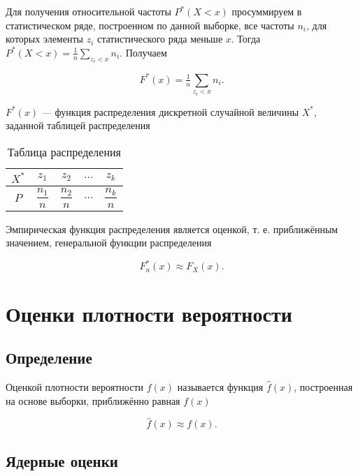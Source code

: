 \documentclass{article}
\begin{document}
Для получения относительной частоты $P^*(X < x)$ просуммируем в статистическом ряде, построенном по данной выборке, все частоты $n_i$, для которых элементы $z_i$ статистического ряда меньше $x$. Тогда $P^*(X < x) = \tfrac{1}{n}\sum\limits_{z_i < x}n_i$. Получаем

\begin{equation}
    F^*(x) = \tfrac{1}{n}\sum\limits_{z_i < x}n_i.
\end{equation}

$F^*(x)$ --- функция распределения дискретной случайной величины $X^*$, заданной таблицей распределения

\begin{table}[h!]
\begin{center}
\begin{tabular}{|c|c|c|c|c|}
\hline
$X^*$ & $z_1$ & $z_2$ & $...$ & $z_k$ \\
\hline
$P$ & $\dfrac{n_1}{n}$ & $\dfrac{n_2}{n}$ & $...$ & $\dfrac{n_k}{n}$ \\
\hline
\end{tabular}
\end{center}
\caption{Таблица распределения}
\end{table}

Эмпирическая функция распределения является оценкой, т. е. приближённым значением, генеральной функции распределения

\begin{equation}
    F_n^*(x) \approx F_X(x).
\end{equation}

\section{Оценки плотности вероятности}

\subsection{Определение}

Оценкой плотности вероятности $f(x)$ называется функция $\widehat{f}(x)$, построенная на основе выборки, приближённо равная $f(x)$

\begin{equation}
    \widehat{f}(x) \approx f(x).
\end{equation}

\subsection{Ядерные оценки}
\end{document}
